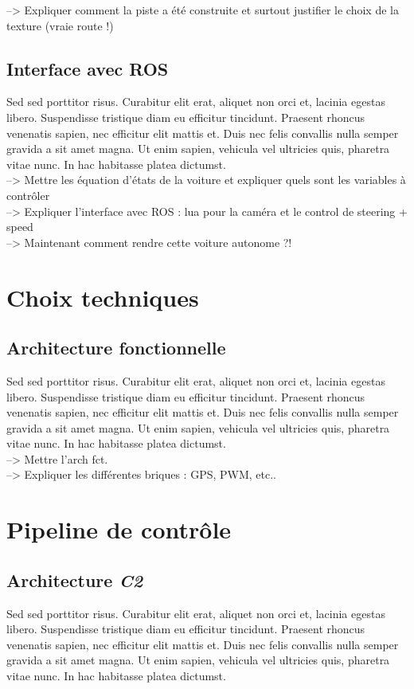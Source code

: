\documentclass[12pt, openany]{report}
\begin{document}
--> Expliquer comment la piste a été construite et surtout justifier le choix de la texture (vraie route !)

\subsection{Interface avec \textsc{ROS}}
Sed sed porttitor risus. Curabitur elit erat, aliquet non orci et, lacinia egestas libero. Suspendisse tristique diam eu efficitur tincidunt. Praesent rhoncus venenatis sapien, nec efficitur elit mattis et. Duis nec felis convallis nulla semper gravida a sit amet magna. Ut enim sapien, vehicula vel ultricies quis, pharetra vitae nunc. In hac habitasse platea dictumst.\\

--> Mettre les équation d'états de la voiture et expliquer quels sont les variables à contrôler\\

--> Expliquer l'interface avec ROS : lua pour la caméra et le control de steering + speed\\

--> Maintenant comment rendre cette voiture autonome ?!

\section{Choix techniques}
\subsection{Architecture fonctionnelle}
Sed sed porttitor risus. Curabitur elit erat, aliquet non orci et, lacinia egestas libero. Suspendisse tristique diam eu efficitur tincidunt. Praesent rhoncus venenatis sapien, nec efficitur elit mattis et. Duis nec felis convallis nulla semper gravida a sit amet magna. Ut enim sapien, vehicula vel ultricies quis, pharetra vitae nunc. In hac habitasse platea dictumst.\\

--> Mettre l'arch fct.\\

--> Expliquer les différentes briques : GPS, PWM, etc..

\section{Pipeline de contrôle}
\subsection{Architecture \textit{C2}}
Sed sed porttitor risus. Curabitur elit erat, aliquet non orci et, lacinia egestas libero. Suspendisse tristique diam eu efficitur tincidunt. Praesent rhoncus venenatis sapien, nec efficitur elit mattis et. Duis nec felis convallis nulla semper gravida a sit amet magna. Ut enim sapien, vehicula vel ultricies quis, pharetra vitae nunc. In hac habitasse platea dictumst.\\
\end{document}
